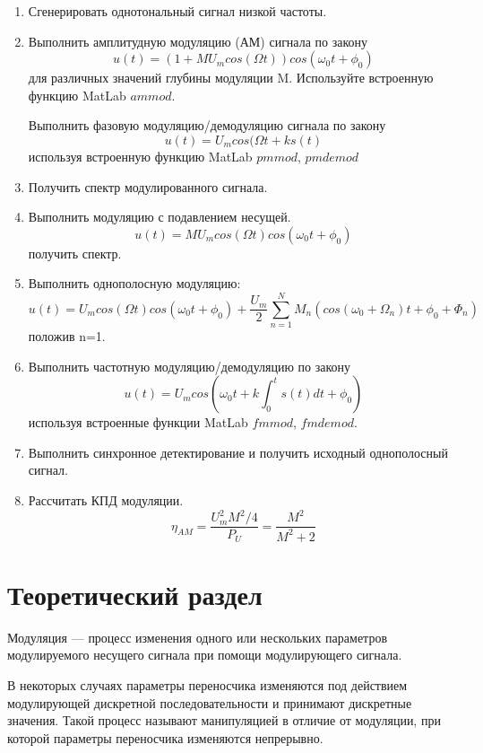 \documentclass[a4paper,14pt]{extarticle}
\begin{document}
\begin{enumerate}
\item Сгенерировать однотональный сигнал низкой частоты.

\item Выполнить амплитудную модуляцию (АМ) сигнала по закону
$$ u(t) = (1 + MU_m cos(\Omega t)) cos(\omega_0 t + \phi_0)$$
для различных значений глубины модуляции M. Используйте встроенную функцию MatLab $ammod$.

Выполнить фазовую модуляцию/демодуляцию сигнала по закону 
$$ u(t) = U_m cos(\Omega t + ks(t)$$
используя встроенную функцию MatLab $pmmod$, $pmdemod$

\item Получить спектр модулированного сигнала.

\item Выполнить модуляцию с подавлением несущей.
$$ u(t) = MU_m cos(\Omega t) cos(\omega_0 t + \phi_0)$$
получить спектр.
\item Выполнить однополосную модуляцию:
$$\displaystyle u(t) = U_m cos(\Omega t) cos(\omega_0 t + \phi_0) + \frac{U_m}{2} \sum^N_{n=1}M_n(cos(\omega_0 + \Omega_n) t + \phi_0 + \Phi_n)$$
положив n=1.

\item Выполнить частотную модуляцию/демодуляцию по закону
$$\displaystyle u(t) = U_m cos(\omega_0 t + k \int_0^t s(t)dt + \phi_0)$$
используя встроенные функции MatLab $fmmod$, $fmdemod$.

\item Выполнить синхронное детектирование и получить исходный
однополосный сигнал.

\item Рассчитать КПД модуляции.
$$\displaystyle \eta_{AM} = \frac{U^2_m M^2/4}{P_U} = \frac{M^2}{M^2 + 2}$$
\end{enumerate}

\section{Теоретический раздел}

Модуляция — процесс изменения одного или нескольких параметров модулируемого несущего сигнала при помощи модулирующего сигнала.

В некоторых случаях параметры переносчика изменяются под действием модулирующей дискретной последовательности и принимают дискретные значения. Такой процесс называют манипуляцией в отличие от модуляции, при которой параметры переносчика изменяются непрерывно.
\end{document}
